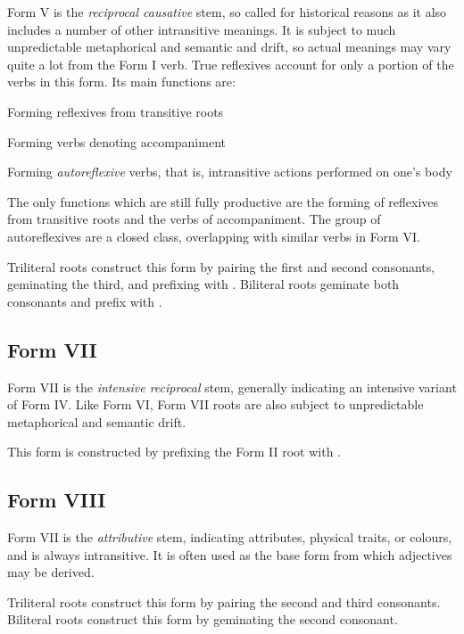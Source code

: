 \documentclass[grammar]{subfiles}
\begin{document}
  Form V is the \emph{reciprocal causative} stem, so called for historical reasons as it also includes a number of other intransitive meanings. 
  It is subject to much unpredictable metaphorical and semantic and drift, so actual meanings may vary quite a lot from the Form I verb.
  True reflexives account for only a portion of the verbs in this form. 
  Its main functions are: 

  \begin{itemize*}
    \item Forming reflexives from transitive roots
    \item Forming verbs denoting accompaniment
    \item Forming \emph{autoreflexive} verbs, that is, intransitive actions performed on one’s body
  \end{itemize*}

  The only functions which are still fully productive are the forming of reflexives from transitive roots and the verbs of accompaniment. 
  The group of autoreflexives are a closed class, overlapping with similar verbs in Form VI.

  Triliteral roots construct this form by pairing the first and second consonants, geminating the third, and prefixing with . 
  Biliteral roots geminate both consonants and prefix with .

  \subsection{Form VII}
  \label{ssec:dev_verb_form_vii}

  Form VII is the \emph{intensive reciprocal} stem, generally indicating an intensive variant of Form IV.
  Like Form VI, Form VII roots are also subject to unpredictable metaphorical and semantic drift.

  This form is constructed by prefixing the Form II root with .

  \subsection{Form VIII}
  \label{ssec:dev_verb_form_viii}

  Form VII is the \emph{attributive} stem, indicating attributes, physical traits, or colours, and is always intransitive. 
  It is often used as the base form from which adjectives may be derived.

  Triliteral roots construct this form by pairing the second and third consonants. 
  Biliteral roots construct this form by geminating the second consonant.
\end{document}
